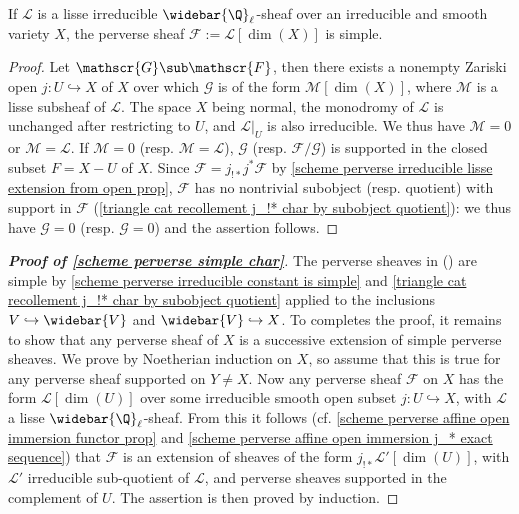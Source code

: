 \begin{lemma}\label{scheme perverse irreducible constant is simple}
If $\mathscr{L}$ is a lisse irreducible $\widebar{\Q}_\ell$-sheaf over an irreducible and smooth variety $X$, the perverse sheaf $\mathscr{F}:=\mathscr{L}[\dim(X)]$ is simple.
\end{lemma}
\begin{proof}
Let $\mathscr{G}\sub\mathscr{F}$, then there exists a nonempty Zariski open $j:U\hookrightarrow X$ of $X$ over which $\mathscr{G}$ is of the form $\mathscr{M}[\dim(X)]$, where $\mathscr{M}$ is a lisse subsheaf of $\mathscr{L}$. The space $X$ being normal, the monodromy of $\mathscr{L}$ is unchanged after restricting to $U$, and $\mathscr{L}|_U$ is also irreducible. We thus have $\mathscr{M}=0$ or $\mathscr{M}=\mathscr{L}$. If $\mathscr{M}=0$ (resp. $\mathscr{M}=\mathscr{L}$), $\mathscr{G}$ (resp. $\mathscr{F}/\mathscr{G}$) is supported in the closed subset $F=X-U$ of $X$. Since $\mathscr{F}=j_{!*}j^*\mathscr{F}$ by \cref{scheme perverse irreducible lisse extension from open prop}, $\mathscr{F}$ has no nontrivial subobject (resp. quotient) with support in $\mathscr{F}$ (\cref{triangle cat recollement j_!* char by subobject quotient}): we thus have $\mathscr{G}=0$ (resp. $\mathscr{G}=0$) and the assertion follows.
\end{proof}

\begin{proof}[\textbf{Proof of \cref{scheme perverse simple char}}]
The perverse sheaves in () are simple by \cref{scheme perverse irreducible constant is simple} and \cref{triangle cat recollement j_!* char by subobject quotient} applied to the inclusions $V\hookrightarrow\widebar{V}$ and $\widebar{V}\hookrightarrow X$. To completes the proof, it remains to show that any perverse sheaf of $X$ is a successive extension of simple perverse sheaves. We prove by Noetherian induction on $X$, so assume that this is true for any perverse sheaf supported on $Y\neq X$. Now any perverse sheaf $\mathscr{F}$ on $X$ has the form $\mathscr{L}[\dim(U)]$ over some irreducible smooth open subset $j:U\hookrightarrow X$, with $\mathscr{L}$ a lisse $\widebar{\Q}_\ell$-sheaf. From this it follows (cf. \cref{scheme perverse affine open immersion functor prop} and \cref{scheme perverse affine open immersion j_* exact sequence}) that $\mathscr{F}$ is an extension of sheaves of the form $j_{!*}\mathscr{L}'[\dim(U)]$, with $\mathscr{L}'$ irreducible sub-quotient of $\mathscr{L}$, and perverse sheaves supported in the complement of $U$. The assertion is then proved by induction.
\end{proof}

